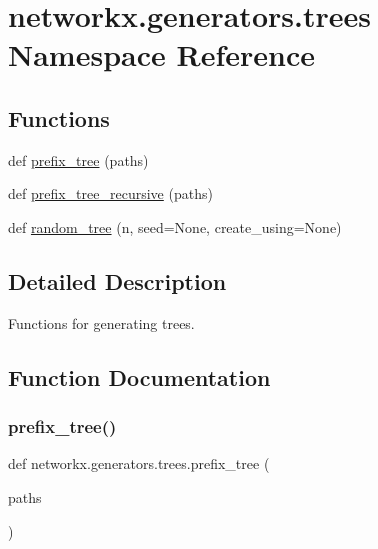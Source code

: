 \hypertarget{namespacenetworkx_1_1generators_1_1trees}{}\section{networkx.\+generators.\+trees Namespace Reference}
\label{namespacenetworkx_1_1generators_1_1trees}
\subsection*{Functions}
\begin{DoxyCompactItemize}
\item 
def \hyperlink{namespacenetworkx_1_1generators_1_1trees_a3b35b24b5057cc067d2b4d0127f586a9}{prefix\+\_\+tree} (paths)
\item 
def \hyperlink{namespacenetworkx_1_1generators_1_1trees_a8e7c31c09253b1e1f5052437d5a7e267}{prefix\+\_\+tree\+\_\+recursive} (paths)
\item 
def \hyperlink{namespacenetworkx_1_1generators_1_1trees_a8423414dc7c03c951d99e44d69566d93}{random\+\_\+tree} (n, seed=None, create\+\_\+using=None)
\end{DoxyCompactItemize}


\subsection{Detailed Description}
\begin{DoxyVerb}Functions for generating trees.\end{DoxyVerb}
 

\subsection{Function Documentation}
\mbox{\label{namespacenetworkx_1_1generators_1_1trees_a3b35b24b5057cc067d2b4d0127f586a9}} 
\subsubsection{\texorpdfstring{prefix\+\_\+tree()}{prefix\_tree()}}
{\footnotesize\ttfamily def networkx.\+generators.\+trees.\+prefix\+\_\+tree (\begin{DoxyParamCaption}\item[{}]{paths }\end{DoxyParamCaption})}

